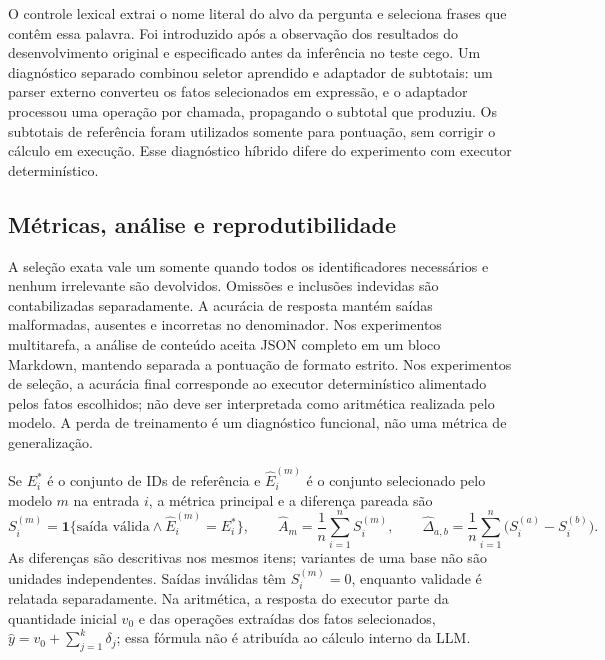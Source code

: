 \documentclass[12pt,a4paper]{article}
\begin{document}
O controle lexical extrai o nome literal do alvo da pergunta e seleciona frases que contêm essa palavra. Foi introduzido após a observação dos resultados do desenvolvimento original e especificado antes da inferência no teste cego. Um diagnóstico separado combinou seletor aprendido e adaptador de subtotais: um parser externo converteu os fatos selecionados em expressão, e o adaptador processou uma operação por chamada, propagando o subtotal que produziu. Os subtotais de referência foram utilizados somente para pontuação, sem corrigir o cálculo em execução. Esse diagnóstico híbrido difere do experimento com executor determinístico.

\subsection{Métricas, análise e reprodutibilidade}
A seleção exata vale um somente quando todos os identificadores necessários e nenhum irrelevante são devolvidos. Omissões e inclusões indevidas são contabilizadas separadamente. A acurácia de resposta mantém saídas malformadas, ausentes e incorretas no denominador. Nos experimentos multitarefa, a análise de conteúdo aceita JSON completo em um bloco Markdown, mantendo separada a pontuação de formato estrito. Nos experimentos de seleção, a acurácia final corresponde ao executor determinístico alimentado pelos fatos escolhidos; não deve ser interpretada como aritmética realizada pelo modelo. A perda de treinamento é um diagnóstico funcional, não uma métrica de generalização.

Se $E_i^*$ é o conjunto de IDs de referência e $\widehat E_i^{(m)}$ é o conjunto selecionado pelo modelo $m$ na entrada $i$, a métrica principal e a diferença pareada são
\begin{equation}\label{eq:selection-pt}
S_i^{(m)}=\mathbf{1}\{\text{saída válida}\land \widehat E_i^{(m)}=E_i^*\},
\qquad
\widehat A_m=\frac{1}{n}\sum_{i=1}^{n}S_i^{(m)},\qquad
\widehat\Delta_{a,b}=\frac{1}{n}\sum_{i=1}^{n}
\bigl(S_i^{(a)}-S_i^{(b)}\bigr).
\end{equation}
As diferenças são descritivas nos mesmos itens; variantes de uma base não são unidades independentes. Saídas inválidas têm $S_i^{(m)}=0$, enquanto validade é relatada separadamente. Na aritmética, a resposta do executor parte da quantidade inicial $v_0$ e das operações extraídas dos fatos selecionados, $\widehat y=v_0+\sum_{j=1}^{k}\delta_j$; essa fórmula não é atribuída ao cálculo interno da LLM.
\end{document}

